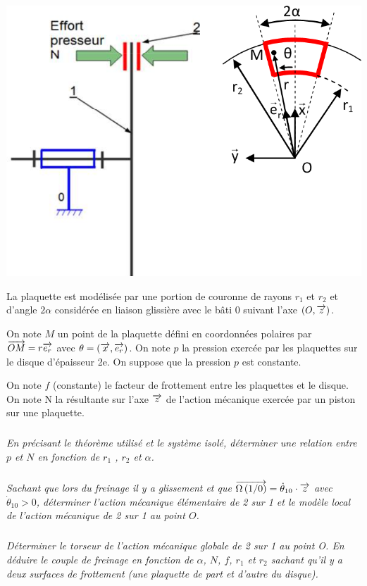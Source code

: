 \documentclass[10pt]{article}
\begin{document}
\begin{minipage}[c]{.3\linewidth}
\begin{center}
\includegraphics[width=\textwidth]{images/frein3}
\end{center}
\end{minipage} \hfill
\begin{minipage}[c]{.62\linewidth}
La plaquette est modélisée par une portion de couronne de rayons $r_1$ et $r_2$ et d'angle $2\alpha$ considérée en liaison glissière avec le bâti 0 suivant l’axe $(O,\overrightarrow{z})$. 

On note $M$ un point de la plaquette défini en coordonnées polaires par $\overrightarrow{OM}=r\overrightarrow{e_r}$
avec $\theta=\left(\overrightarrow{x},\overrightarrow{e_r}\right)$.
On note $p$ la pression exercée par les plaquettes sur le disque d’épaisseur 2e. On suppose que la pression $p$ est constante.  

On note $f$ (constante) le facteur de frottement entre les plaquettes et le disque.  On note N la résultante sur l’axe $\overrightarrow{z}$ de l'action mécanique exercée par un piston sur une plaquette. 
\end{minipage}



\subparagraph{}
\textit{En précisant le théorème utilisé et le système isolé, déterminer une relation entre $p$ et $N$ en fonction de $r_1$ , $r_2$  et $\alpha$. }

\subparagraph{}
\textit{Sachant que lors du freinage il y a glissement et que $\overrightarrow{\Omega\left( {1}/{0}\right)}=\dot{\theta}_{10}\cdot \overrightarrow{z}$ avec $\dot{\theta}_{10}>0$, déterminer l'action mécanique élémentaire de 2 sur 1 et le modèle local de l’action mécanique de 2 sur 1 au point $O$. }

\subparagraph{}
\textit{Déterminer le torseur de l'action mécanique globale de 2 sur 1 au point O. En déduire le couple de freinage en fonction de $\alpha$, $N$, $f$, $r_1$ et $r_2$ sachant qu'il y a deux surfaces de frottement (une plaquette de part et d'autre du disque). }
\end{document}
